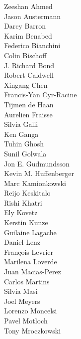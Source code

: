 \documentclass[PICOReport.tex]{subfiles}
\begin{document}
\footnotesize {

\begin{multicols}{4}
Zeeshan Ahmed                   \\
Jason Austermann                \\
Darcy Barron                    \\
Karim Benabed                   \\
Federico Bianchini              \\
Colin Bischoff                  \\
J. Richard Bond                 \\
Robert Caldwell                 \\
Xingang Chen                    \\
Francis-Yan Cyr-Racine          \\
Tijmen de Haan                  \\
Aurelien Fraisse                \\
Silvia Galli                    \\
Ken Ganga                       \\
Tuhin Ghosh                     \\
Sunil Golwala                   \\
Jon E. Gudmundsson              \\
Kevin M. Huffenberger           \\
Marc Kamionkowski               \\
Reijo Keskitalo                 \\
Rishi Khatri                    \\
Ely Kovetz                      \\
Kerstin Kunze                   \\
Guilaine Lagache                \\
Daniel Lenz                     \\
Fran\c{c}ois Levrier            \\
Marilena Loverde                \\
Juan Macias-Perez               \\
Carlos Martins                  \\
Silvia Masi                     \\
Joel Meyers                     \\
Lorenzo Moncelsi                \\
Pavel Motloch                   \\
Tony Mroczkowski                \\

\end{multicols}}
\end{document}
